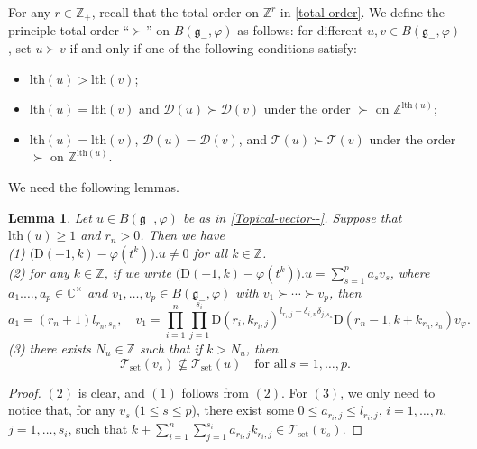 \documentclass[12pt, a4paper]{amsart}
\newcommand{\fg}{\mathfrak g}
\newcommand{\C}{\mathbb{C}}
\newcommand{\Z}{\mathbb Z}
\newcommand{\rD}{\mathrm{D}}
\theoremstyle{Theorem}
\theoremstyle{Theorem}
\newtheorem{lemma}[thm]{Lemma}
\numberwithin{equation}{section}
\begin{document}
For any $r\in\Z_{+}$, recall that the total order on $\Z^{r}$ in \eqref{total-order}.
We define the principle total order ``$\succ$'' on $B(\fg_{-},\varphi)$ as follows:
for different $u,v\in B(\fg_{-},\varphi)$, set $u\succ v$ if and only if one of the following conditions satisfy:
     \begin{itemize}
     \item $\text{lth}(u)>\text{lth}(v)$;
     \item $\text{lth}(u)=\text{lth}(v)$ and $\mathcal{D}(u)\succ\mathcal{D}(v)$
     under the order $\succ$ on $\Z^{\text{lth}(u)}$;
     \item $\text{lth}(u)=\text{lth}(v)$, $\mathcal{D}(u)=\mathcal{D}(v)$,
     and $\mathcal{T}(u)\succ\mathcal{T}(v)$
     under the order $\succ$ on $\Z^{\text{lth}(u)}$.
     \end{itemize}

We need the following lemmas.
\begin{lemma}\label{>0-case}
Let $u\in B(\fg_{-},\varphi)$ be as in \eqref{Topical-vector--}.
Suppose that $\mathrm{lth}(u)\geq1$ and $r_{n}>0$. Then we have\\
(1) $\big(\rD(-1,k)-\varphi(t^{k})\big).u\neq0$ for all $k\in\Z$.\\
(2) for any $k\in\Z$, if we write $\big(\rD(-1,k)-\varphi(t^{k})\big).u=\sum_{s=1}^{p}a_{s}v_{s}$,
where $a_{1}.\dots,a_{p}\in\C^{\times}$ and $v_{1},\dots,v_{p}\in B(\fg_{-},\varphi)$
with $v_{1}\succ\cdots\succ v_{p}$, then
\[a_{1}=(r_{n}+1)l_{r_{n},s_{n}},\quad v_{1}=\prod_{i=1}^{n}\prod_{j=1}^{s_{i}}
\rD(r_{i},k_{r_{i},j})^{l_{r_{i},j}-\delta_{i,n}\delta_{j,s_{n}}}\rD(r_{n}-1,k+k_{r_{n},s_{n}})v_{\varphi}.\]
(3) there exists $N_{u}\in\Z$ such that if $k>N_{u}$, then
\[\mathcal{T}_{\mathrm{set}}(v_{s})\nsubseteq\mathcal{T}_{\mathrm{set}}(u)
\quad\text{for all}\ s=1,\dots,p.\]
\end{lemma}
\begin{proof}
$(2)$ is clear, and $(1)$ follows from $(2)$. For $(3)$, we only need to
notice that, for any $v_{s}$ ($1\leq s\leq p$), there exist some $0\leq a_{r_{i},j}\leq l_{r_{i},j}$,
$i=1,\dots,n$, $j=1,\dots,s_{i}$, such that
$k+\sum_{i=1}^{n}\sum_{j=1}^{s_{i}}a_{r_{i},j}k_{r_{i},j}\in \mathcal{T}_{\mathrm{set}}(v_{s})$.
\end{proof}
\end{document}
